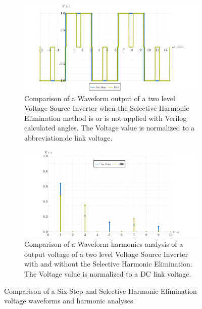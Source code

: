 \documentclass[a4paper, twoside, 11pt]{article}
\begin{document}
            \begin{figure}[htbp!]
                \centering
                \begin{subfigure}[t]{0.45\textwidth}
                    \includegraphics[width=1\textwidth]{src/png/ComparisonPlotSixStepVerilogSheWaveform.png}
                    \caption{Comparison of a Waveform output of a two level Voltage Source Inverter when the Selective Harmonic Elimination method is or is not applied with Verilog calculated angles. The Voltage value is normalized to a \gls{abbreviation:dc} link voltage.}
                    \label{fig:ComparataionPlotSixStepVerilogSheWaveform}
                \end{subfigure}
                \hspace{0.05\textwidth}
                \begin{subfigure}[t]{0.45\textwidth}
                    \includegraphics[width=1\textwidth]{src/png/ComparisonPlotSixStepVerilogSheHarmonics.png}
                    \caption{Comparison of a Waveform harmonics analysis of a output voltage of a two level Voltage Source Inverter with and without the Selective Harmonic Elimination. The Voltage value is normalized to a DC link voltage.}
                    \label{fig:ComparataionPlotSixStepVerilogSheHarmonics}
                \end{subfigure}
                \caption{Comparison of a Six-Step and Selective Harmonic Elimination voltage waveforms and harmonic analyses.}
            \end{figure}
            \FloatBarrier
\end{document}
